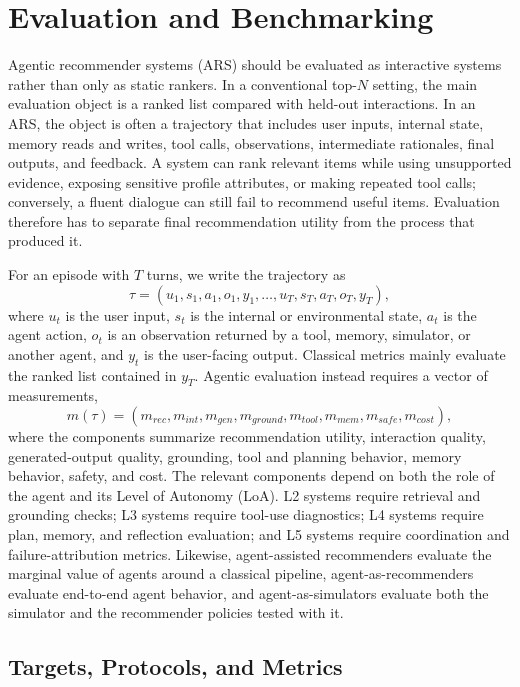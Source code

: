 \section{Evaluation and Benchmarking}
\label{sec:evaluation}

Agentic recommender systems (ARS) should be evaluated as interactive systems rather than only as static rankers. In a conventional top-$N$ setting, the main evaluation object is a ranked list compared with held-out interactions. In an ARS, the object is often a trajectory that includes user inputs, internal state, memory reads and writes, tool calls, observations, intermediate rationales, final outputs, and feedback. A system can rank relevant items while using unsupported evidence, exposing sensitive profile attributes, or making repeated tool calls; conversely, a fluent dialogue can still fail to recommend useful items. Evaluation therefore has to separate final recommendation utility from the process that produced it.

For an episode with $T$ turns, we write the trajectory as
\[
\tau=(u_1,s_1,a_1,o_1,y_1,\ldots,u_T,s_T,a_T,o_T,y_T),
\]
where $u_t$ is the user input, $s_t$ is the internal or environmental state, $a_t$ is the agent action, $o_t$ is an observation returned by a tool, memory, simulator, or another agent, and $y_t$ is the user-facing output. Classical metrics mainly evaluate the ranked list contained in $y_T$. Agentic evaluation instead requires a vector of measurements,
\[
m(\tau)=(m_{rec},m_{int},m_{gen},m_{ground},m_{tool},m_{mem},m_{safe},m_{cost}),
\]
where the components summarize recommendation utility, interaction quality, generated-output quality, grounding, tool and planning behavior, memory behavior, safety, and cost. The relevant components depend on both the role of the agent and its Level of Autonomy (LoA). L2 systems require retrieval and grounding checks; L3 systems require tool-use diagnostics; L4 systems require plan, memory, and reflection evaluation; and L5 systems require coordination and failure-attribution metrics. Likewise, agent-assisted recommenders evaluate the marginal value of agents around a classical pipeline, agent-as-recommenders evaluate end-to-end agent behavior, and agent-as-simulators evaluate both the simulator and the recommender policies tested with it.





\subsection{Targets, Protocols, and Metrics}
\label{subsec:evaluation-taxonomy}

